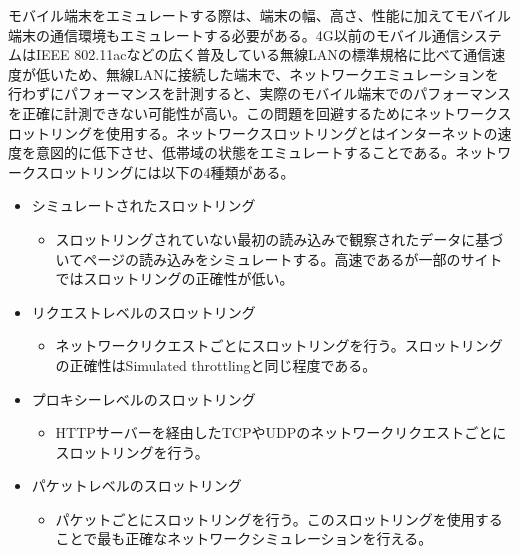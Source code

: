 モバイル端末をエミュレートする際は、端末の幅、高さ、性能に加えてモバイル端末の通信環境もエミュレートする必要がある。4G以前のモバイル通信システムはIEEE 802.11acなどの広く普及している無線LANの標準規格に比べて通信速度が低いため、無線LANに接続した端末で、ネットワークエミュレーションを行わずにパフォーマンスを計測すると、実際のモバイル端末でのパフォーマンスを正確に計測できない可能性が高い。この問題を回避するためにネットワークスロットリングを使用する。ネットワークスロットリングとはインターネットの速度を意図的に低下させ、低帯域の状態をエミュレートすることである。ネットワークスロットリングには以下の4種類がある。

\begin{itemize}
    \item シミュレートされたスロットリング
    \begin{itemize}
        \item スロットリングされていない最初の読み込みで観察されたデータに基づいてページの読み込みをシミュレートする。高速であるが一部のサイトではスロットリングの正確性が低い。
    \end{itemize}
    \item リクエストレベルのスロットリング
    \begin{itemize}
        \item ネットワークリクエストごとにスロットリングを行う。スロットリングの正確性はSimulated throttlingと同じ程度である。
    \end{itemize}
    \item プロキシーレベルのスロットリング
    \begin{itemize}
        \item HTTPサーバーを経由したTCPやUDPのネットワークリクエストごとにスロットリングを行う。
    \end{itemize}
    \item パケットレベルのスロットリング
    \begin{itemize}
        \item パケットごとにスロットリングを行う。このスロットリングを使用することで最も正確なネットワークシミュレーションを行える。
    \end{itemize}
\end{itemize}

